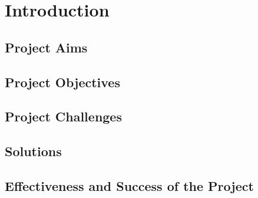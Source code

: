 \chapter{Introduction}

\section{Project Aims}

\section{Project Objectives}

\section{Project Challenges}

\section{Solutions}

\section{Effectiveness and Success of the Project}